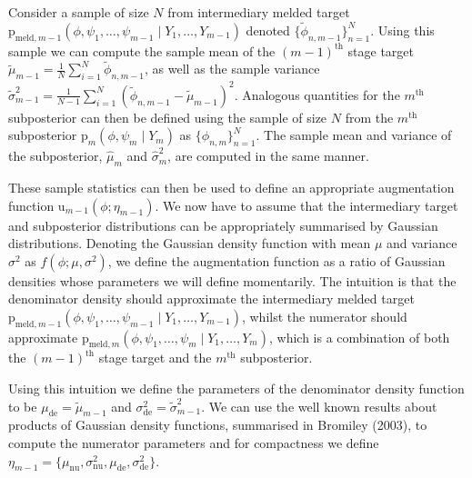 \documentclass[10pt,a4paper,]{article}
\newcommand{\pd}{\text{p}}
\newcommand{\tarw}{\text{u}}
\newcommand{\Nx}{N}
\newcommand{\sampleindex}{n}
\newcommand{\modelindex}{m}
\begin{document}
Consider a sample of size \(\Nx\) from intermediary melded target
\(\pd_{\text{meld}, \modelindex - 1}(\phi, \psi_{1}, \ldots, \psi_{\modelindex - 1} \mid Y_{1}, \ldots, Y_{\modelindex - 1})\)
denoted
\(\{\tilde{\phi}_{\sampleindex, \modelindex - 1}\}_{\sampleindex = 1}^{\Nx}\).
Using this sample we can compute the sample mean of the
\((\modelindex - 1)^{\text{th}}\) stage target
\(\tilde{\mu}_{\modelindex - 1} = \frac{1}{\Nx}\sum\limits_{i = 1}^{\Nx}\tilde{\phi}_{\sampleindex, \modelindex - 1}\),
as well as the sample variance
\(\tilde{\sigma}^{2}_{\modelindex - 1} = \frac{1}{\Nx - 1}\sum\limits_{i = 1}^{\Nx} (\tilde{\phi}_{\sampleindex, \modelindex - 1} - \tilde{\mu}_{\modelindex - 1})^{2}\).
Analogous quantities for the \(\modelindex^{\text{th}}\) subposterior
can then be defined using the sample of size \(\Nx\) from the
\(\modelindex^{\text{th}}\) subposterior
\(\pd_{\modelindex}(\phi, \psi_{\modelindex} \mid Y_{\modelindex})\) as
\(\{\phi_{\sampleindex, \modelindex}\}_{\sampleindex = 1}^{\Nx}\). The
sample mean and variance of the subposterior,
\(\hat{\mu}_{\modelindex}\) and \(\hat{\sigma}^{2}_{\modelindex}\), are
computed in the same manner.

These sample statistics can then be used to define an appropriate
augmentation function
\(\tarw_{\modelindex - 1}(\phi; \eta_{\modelindex - 1})\). We now have
to assume that the intermediary target and subposterior distributions
can be appropriately summarised by Gaussian distributions. Denoting the
Gaussian density function with mean \(\mu\) and variance \(\sigma^2\) as
\(f(\phi; \mu, \sigma^2)\), we define the augmentation function as a
ratio of Gaussian densities
 whose
parameters we will define momentarily. The intuition is that the
denominator density should approximate the intermediary melded target
\(\pd_{\text{meld}, \modelindex - 1}(\phi, \psi_{1}, \ldots, \psi_{\modelindex - 1} \mid Y_{1}, \ldots, Y_{\modelindex - 1})\),
whilst the numerator should approximate
\(\pd_{\text{meld}, \modelindex}(\phi, \psi_{1}, \ldots, \psi_{\modelindex} \mid Y_{1}, \ldots, Y_{\modelindex})\),
which is a combination of both the \((\modelindex - 1)^{\text{th}}\)
stage target and the \(\modelindex^{\text{th}}\) subposterior.

Using this intuition we define the parameters of the denominator density
function to be \(\mu_{\text{de}} = \tilde{\mu}_{\modelindex - 1}\) and
\(\sigma^{2}_{\text{de}} = \tilde{\sigma}^{2}_{\modelindex - 1}\). We
can use the well known results about products of Gaussian density
functions, summarised in Bromiley (2003), to compute the numerator
parameters  and for
compactness we define
\(\eta_{\modelindex - 1} = \{\mu_{\text{nu}}, \sigma^{2}_{\text{nu}}, \mu_{\text{de}}, \sigma^{2}_{\text{de}}\}\).
\end{document}
